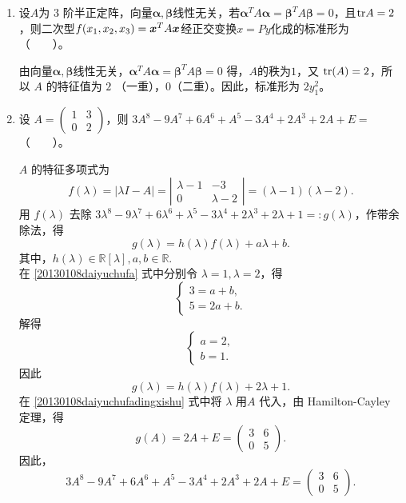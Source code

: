 \begin{enumerate}[1~]
\begin{enumerate}[1.~]
\item
设$A$为 $3$ 阶半正定阵，向量$\boldsymbol{\alpha}, \boldsymbol{\beta}$线性无关，若$\boldsymbol{\alpha}^T A \boldsymbol{\alpha} = \boldsymbol{\beta}^T A \boldsymbol{\beta} = 0$，且${\rm tr} A = 2$，则二次型$f(x_1, x_2, x_3) = \boldsymbol{x}^TA\boldsymbol{x}$经正交变换$x = Py$化成的标准形为 （\ \ \ \ ）。
\begin{solution}
由向量$\boldsymbol{\alpha}, \boldsymbol{\beta}$线性无关，$\boldsymbol{\alpha} ^TA\boldsymbol{\alpha} =\boldsymbol{\beta} ^TA\boldsymbol{\beta} =0$ 得，$A\text{的秩为}1$，又 ${\rm tr}(A)=2$，所以 $A$ 的特征值为 $2$ （一重），$0$（二重）。因此，标准形为 $2y_1^2$。
\end{solution}

\item
设 $A = \left( \begin{smallmatrix}
1&  3\\
0&  2
\end{smallmatrix} \right)$，则 $3A^8-9A^7+6A^6+A^5-3A^4+2A^3+2A+E =$ （\ \ \ \ ）。
\begin{solution}
$A$ 的特征多项式为\[
f(\lambda) = |\lambda I -A| = \left| \begin{matrix}
\lambda-1&  -3\\
0&  \lambda-2
\end{matrix} \right| = (\lambda-1)(\lambda-2). \]
用 $f(\lambda)$ 去除 $3 \lambda^8 -9 \lambda^7 +6 \lambda^6 +\lambda^5 - 3\lambda^4 +2\lambda^3 +2\lambda +1 =: g(\lambda)$，作带余除法，得\begin{equation} \label{20130108daiyuchufa}
g(\lambda) = h(\lambda) f(\lambda) +a \lambda +b. 
\end{equation}
其中，$h(\lambda) \in \mathbb{R}[\lambda], a,b \in \mathbb{R}.$\\
在  \eqref{20130108daiyuchufa} 式中分别令 $\lambda=1 ,\lambda =2$，得\[
\left\{ \begin{array}{l}
3 = a+b,\\
5 = 2a+b. \end{array}\right.
\]
解得 \[
\left\{ \begin{array}{l}
a =2,\\
b =1. \end{array}\right.
\]
因此 \begin{equation} \label{20130108daiyuchufadingxishu}
g(\lambda) = h(\lambda) f(\lambda) +2\lambda +1.
\end{equation}
在  \eqref{20130108daiyuchufadingxishu} 式中将 $\lambda$ 用$A$ 代入，由 Hamilton-Cayley 定理，得\[
g(A)  = 2A+E =\left( \begin{matrix}
3&  6\\
0&  5 
\end{matrix} \right). \]
因此，\[
3 A^8 -9 A^7 +6 A^6 +A^5 - 3A^4 +2A^3 +2A+E = \left( \begin{matrix}
3&  6\\
0&  5 
\end{matrix} \right). \]
\end{solution}


\end{enumerate}
\end{enumerate}
